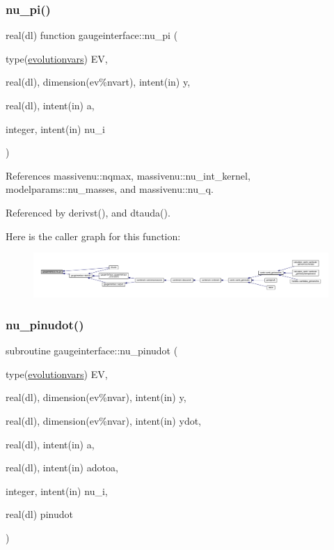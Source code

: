 \subsubsection{\texorpdfstring{nu\+\_\+pi()}{nu\_pi()}}
{\footnotesize\ttfamily real(dl) function gaugeinterface\+::nu\+\_\+pi (\begin{DoxyParamCaption}\item[{type(\mbox{\hyperlink{structgaugeinterface_1_1evolutionvars}{evolutionvars}})}]{EV,  }\item[{real(dl), dimension(ev\%nvart), intent(in)}]{y,  }\item[{real(dl), intent(in)}]{a,  }\item[{integer, intent(in)}]{nu\+\_\+i }\end{DoxyParamCaption})}



References massivenu\+::nqmax, massivenu\+::nu\+\_\+int\+\_\+kernel, modelparams\+::nu\+\_\+masses, and massivenu\+::nu\+\_\+q.



Referenced by derivst(), and dtauda().

Here is the caller graph for this function\+:
\nopagebreak
\begin{figure}[H]
\begin{center}
\leavevmode
\includegraphics[width=350pt]{namespacegaugeinterface_a33373e2888fd46e2c443d7e8c2785639_icgraph}
\end{center}
\end{figure}
\mbox{\label{namespacegaugeinterface_acba44d8f8f824999640418908be29b9b}} 
\subsubsection{\texorpdfstring{nu\+\_\+pinudot()}{nu\_pinudot()}}
{\footnotesize\ttfamily subroutine gaugeinterface\+::nu\+\_\+pinudot (\begin{DoxyParamCaption}\item[{type(\mbox{\hyperlink{structgaugeinterface_1_1evolutionvars}{evolutionvars}})}]{EV,  }\item[{real(dl), dimension(ev\%nvar), intent(in)}]{y,  }\item[{real(dl), dimension(ev\%nvar), intent(in)}]{ydot,  }\item[{real(dl), intent(in)}]{a,  }\item[{real(dl), intent(in)}]{adotoa,  }\item[{integer, intent(in)}]{nu\+\_\+i,  }\item[{real(dl)}]{pinudot }\end{DoxyParamCaption})}



